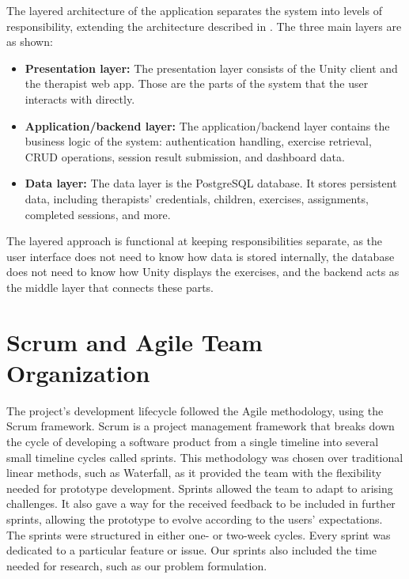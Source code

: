 The layered architecture of the application separates the system into levels of responsibility, extending the architecture described in . The three main layers are as shown:

\begin{itemize}
    \item \textbf{Presentation layer:} The presentation layer consists of the Unity client and the therapist web app. Those are the parts of the system that the user interacts with directly.
    \item \textbf{Application/backend layer:} The application/backend layer contains the business logic of the system: authentication handling, exercise retrieval, CRUD operations, session result submission, and dashboard data.
    \item \textbf{Data layer:} The data layer is the PostgreSQL database. It stores persistent data, including therapists' credentials, children, exercises, assignments, completed sessions, and more.
\end{itemize}

The layered approach is functional at keeping responsibilities separate, as the user interface does not need to know how data is stored internally, the database does not need to know how Unity displays the exercises, and the backend acts as the middle layer that connects these parts.

\section{Scrum and Agile Team Organization}
\label{sec:scrum-and-agile-team-organization}

The project's development lifecycle followed the Agile methodology, using the Scrum framework. Scrum is a project management framework that breaks down the cycle of developing a software product from a single timeline into several small timeline cycles called sprints. This methodology was chosen over traditional linear methods, such as Waterfall, as it provided the team with the flexibility needed for prototype development. Sprints allowed the team to adapt to arising challenges. It also gave a way for the received feedback to be included in further sprints, allowing the prototype to evolve according to the users' expectations. The sprints were structured in either one- or two-week cycles. Every sprint was dedicated to a particular feature or issue. Our sprints also included the time needed for research, such as our problem formulation.

